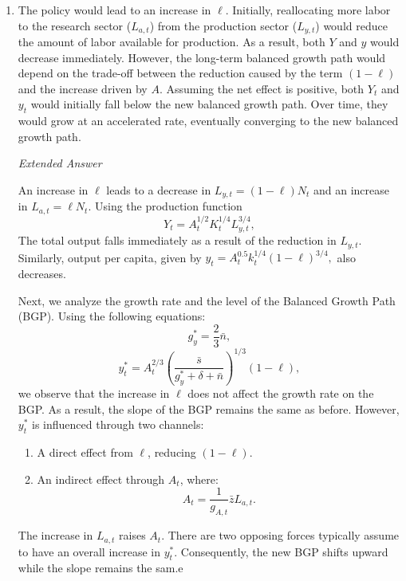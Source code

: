 \documentclass[addpoints,12pt,answers]{exam}
\begin{document}
\begin{enumerate}[label=\textbf{\arabic*.}, itemsep=15pt]
\begin{enumerate}[label=(\alph*)]
			Rearrange and plug it this : $k^*_t  = \frac{\bar{s}}{g_y^* + \delta + \bar{n}} y^*_t$ into the production function:
			
			\[y_t^*= A_t^{0.5} \left(\frac{\bar{s}}{g_y^* + \delta + \bar{n}} y^*_t\right)^{1/4} (1-\ell)^{3/4}\]
			\[\to y_t^{*}= A_t^{2/3} \left(\frac{\bar{s}}{g_y^* + \delta + \bar{n}} \right)^{1/3}  (1-\ell) \]
			
			\vspace{1cm}
			\item The policy would lead to an increase in \( \ell \). Initially, reallocating more labor to the research sector (\( L_{a,t} \)) from the production sector (\( L_{y,t} \)) would reduce the amount of labor available for production. As a result, both \( Y \) and \( y \) would decrease immediately.  			
			However, the long-term balanced growth path would depend on the trade-off between the reduction caused by the term \( (1-\ell) \) and the increase driven by \( A \). Assuming the net effect is positive, both \( Y_t \) and \( y_t \) would initially fall below the new balanced growth path. Over time, they would grow at an accelerated rate, eventually converging to the new balanced growth path.
			
			\textit{Extended Answer}
			
			An increase in \( \ell \) leads to a decrease in \( L_{y,t} = (1-\ell)N_t \) and an increase in \( L_{a,t} = \ell N_t \). Using the production function 
			\[
			Y_t = A_t^{1/2} K_t^{1/4} L_{y,t}^{3/4},
			\]
			The total output falls immediately as a result of the reduction in \( L_{y,t} \). Similarly, output per capita, given by $
			y_t = A_t^{0.5} k_t^{1/4} (1-\ell)^{3/4},
			$
			also decreases.
			
			Next, we analyze the growth rate and the level of the Balanced Growth Path (BGP). Using the following equations:
			\[
			g_y^* =  \frac{2}{3} \bar{n},
			\]
			\[
			y_t^* = A_t^{2/3} \left(\frac{\bar{s}}{g_y^* + \delta + \bar{n}} \right)^{1/3} (1-\ell),
			\]
			we observe that the increase in \( \ell \) does not affect the growth rate on the BGP. As a result, the slope of the BGP remains the same as before. However, \( y_t^* \) is influenced through two channels:
			\begin{enumerate}[label=(\arabic*)]
				\item A direct effect from \( \ell \), reducing \( (1-\ell) \).
				\item An indirect effect through \( A_t \), where:
				\[
				A_t = \frac{1}{g_{A,t}} \bar{z} L_{a,t}.
				\]
			\end{enumerate}
			The increase in \( L_{a,t} \) raises \( A_t \). There are two opposing forces typically assume to have an overall increase in \( y_t^* \). Consequently, the new BGP shifts upward while the slope remains the sam.e
			

\end{enumerate}
\end{enumerate}
\end{document}
